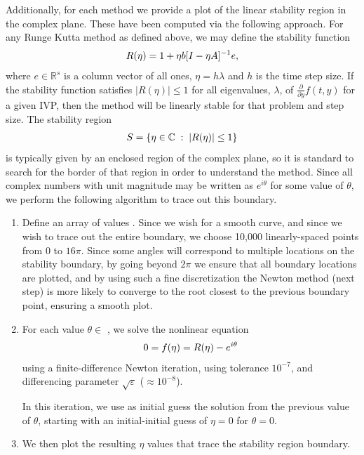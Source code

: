 \documentclass[letterpaper,10pt,english]{sphinxmanual}
\begin{document}
Additionally, for each method we provide a plot of the linear
stability region in the complex plane.  These have been computed via
the following approach.  For any Runge Kutta method as defined above,
we may define the stability function
\begin{gather}
\begin{split}R(\eta) = 1 + \eta b [I - \eta A]^{-1} e,\end{split}\notag
\end{gather}
where \(e\in\mathbb{R}^s\) is a column vector of all ones, \(\eta =
h\lambda\) and \(h\) is the time step size.  If the stability
function satisfies \(|R(\eta)| \le 1\) for all eigenvalues,
\(\lambda\), of \(\frac{\partial }{\partial y}f(t,y)\) for a
given IVP, then the method will be linearly stable for that problem
and step size.  The stability region
\begin{gather}
\begin{split}S = \{ \eta\in\mathbb{C}\; :\; |R(\eta)| \le 1\}\end{split}\notag
\end{gather}
is typically given by an enclosed region of the complex plane, so it
is standard to search for the border of that region in order to
understand the method.  Since all complex numbers with unit magnitude
may be written as \(e^{i\theta}\) for some value of \(\theta\),
we perform the following algorithm to trace out this boundary.
\begin{enumerate}
\item {} 
Define an array of values .  Since we wish for a
smooth curve, and since we wish to trace out the entire boundary,
we choose 10,000 linearly-spaced points from 0 to \(16\pi\).
Since some angles will correspond to multiple locations on the
stability boundary, by going beyond \(2\pi\) we ensure that all
boundary locations are plotted, and by using such a fine
discretization the Newton method (next step) is more likely to
converge to the root closest to the previous boundary point,
ensuring a smooth plot.

\item {} 
For each value \(\theta \in\) , we solve the nonlinear
equation
\begin{gather}
\begin{split}0 = f(\eta) = R(\eta) - e^{i\theta}\end{split}\notag
\end{gather}
using a finite-difference Newton iteration, using tolerance
\(10^{-7}\), and differencing parameter
\(\sqrt{\varepsilon}\) (\(\approx 10^{-8}\)).

In this iteration, we use as initial guess the solution from the
previous value of \(\theta\), starting with an initial-initial
guess of \(\eta=0\) for \(\theta=0\).

\item {} 
We then plot the resulting \(\eta\) values that trace the
stability region boundary.

\end{enumerate}
\end{document}
